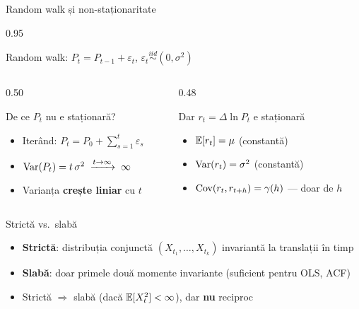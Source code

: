 \documentclass[9pt, aspectratio=169, t]{beamer}
\begin{document}
\begin{frame}[shrink=7]{Random walk și non-staționaritate}
    \begin{cminipage}{0.95\textwidth}
    \begin{block}{Random walk: $P_t = P_{t-1} + \varepsilon_t$, \quad $\varepsilon_t \overset{iid}{\sim} (0, \sigma^2)$}
    \end{block}
    \begin{columns}[T]
    \begin{column}{0.50\textwidth}
    \begin{alertblock}{De ce $P_t$ nu e staționară?}
    \begin{itemize}\setlength{\itemsep}{0pt}
        \item Iterând: $P_t = P_0 + \sum_{s=1}^{t} \varepsilon_s$
        \item $\text{Var}(P_t) = t\,\sigma^2 \;\xrightarrow{t\to\infty}\; \infty$
        \item Varianța \textbf{crește liniar} cu $t$
    \end{itemize}
    \end{alertblock}
    \end{column}
    \begin{column}{0.48\textwidth}
    \begin{exampleblock}{Dar $r_t = \Delta \ln P_t$ e staționară}
    \begin{itemize}\setlength{\itemsep}{0pt}
        \item $\mathbb{E}[r_t] = \mu$ (constantă)
        \item $\text{Var}(r_t) = \sigma^2$ (constantă)
        \item $\text{Cov}(r_t, r_{t+h}) = \gamma(h)$ --- doar de $h$
    \end{itemize}
    \end{exampleblock}
    \end{column}
    \end{columns}
    \vspace{0.1cm}
    \begin{block}{Strictă vs.\ slabă}
    \begin{itemize}\setlength{\itemsep}{0pt}
        \item \textbf{Strictă}: distribuția conjunctă $(X_{t_1}, \ldots, X_{t_k})$ invariantă la translații în timp
        \item \textbf{Slabă}: doar primele două momente invariante (suficient pentru OLS, ACF)
        \item Strictă $\Rightarrow$ slabă (dacă $\mathbb{E}[X_t^2] < \infty$), dar \textbf{nu} reciproc
    \end{itemize}
    \end{block}
    \end{cminipage}
\end{frame}
\end{document}
